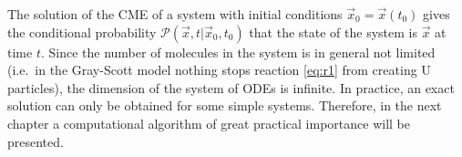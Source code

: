 The solution of the CME of a system with initial conditions $\vec{x}_0 = \vec{x}(t_0)$ gives the conditional probability $\mathcal{P}(\vec{x},t|\vec{x}_0,t_0)$ that the state of the system is $\vec{x}$ at time $t$. Since the number of molecules in the system is in general not limited (i.e.\ in the Gray-Scott model nothing stops reaction \eqref{eq:r1} from creating  U particles), the dimension of the system of ODEs is infinite. In practice, an exact solution can only be obtained for some simple systems. Therefore, in the next chapter a computational algorithm of great practical importance will be presented. 
%
%